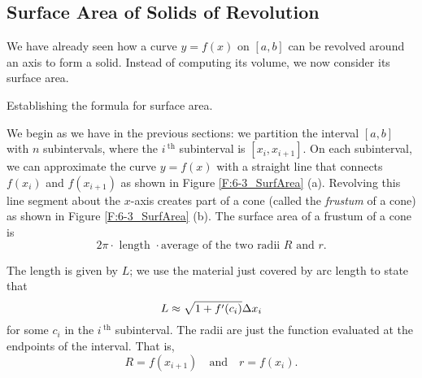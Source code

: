




\subsection*{Surface Area of Solids of Revolution}

We have already seen how a curve $y=f(x)$ on $[a,b]$ can be revolved around an axis to form a solid. Instead of computing its volume, we now consider its surface area.

\begin{marginfigure}[6cm] %
\captionsetup[subfigure]{labelformat=empty}


\caption{Establishing the formula for surface area.} \label{F:6-3_SurfArea}
\end{marginfigure}

We begin as we have in the previous sections: we partition the interval $[a,b]$ with $n$ subintervals, where the $i\,^{\text{th}}$ subinterval is $[x_i,x_{i+1}]$. On each subinterval, we can approximate the curve $y=f(x)$ with a straight line that connects $f(x_i)$ and $f(x_{i+1})$ as shown in Figure \ref{F:6-3_SurfArea} (a). Revolving this line segment about the $x$-axis creates part of a cone (called the \textit{frustum} of a cone) as shown in Figure \ref{F:6-3_SurfArea} (b). The surface area of a frustum of a cone is $$2\pi\cdot\text{ length }\cdot\text{average of the two radii $R$ and $r$}.$$

The length is given by $L$; we use the material just covered by arc length to state that $$L\approx \sqrt{1+f'(c_i)}\Delta x_i$$ for some $c_i$ in the $i\,^\text{th}$ subinterval. The radii are just the function evaluated at the endpoints of the interval. That is, $$R = f(x_{i+1})\quad \text{and}\quad r = f(x_i).$$

